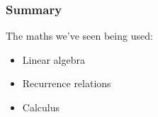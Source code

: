 \documentclass{beamer}
\begin{document}
\begin{frame}
    \frametitle{Summary}
    The maths we've seen being used:
    \begin{itemize}
        \item Linear algebra
        \item Recurrence relations
        \item Calculus
    \end{itemize}
\end{frame}


\end{document}
